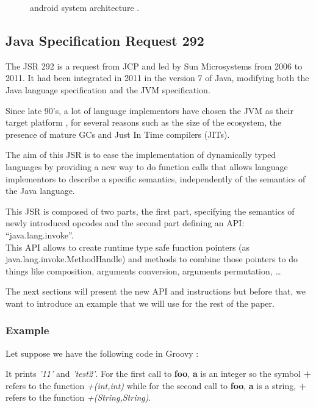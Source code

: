 \documentclass{sig-alternate}
\def \JCP{JCP\xspace}
\def \SUN{Sun Microsystems\xspace}
\def \Jsr{JSR\xspace}
\def \JSR{\Jsr 292\xspace}
\def \JVM{JVM\xspace}
\begin{document}
    \begin{figure}[!h]
      \centering \resizebox{\linewidth}{!}{}
      \caption{android system architecture \cite{wiki-android}.}
      \label{ASA}
    \end{figure}

  \subsection{Java Specification Request 292}

    The \JSR is a request from \JCP and led by \SUN from 2006 to 2011.
    It had been integrated in 2011 in the version 7 of Java,
    modifying both the Java language specification and the \JVM specification.

    Since late 90's, a lot of language
    implementors have chosen the JVM as their target platform \cite{wiki-jvm-lang},
    for several reasons such as the size of the ecosystem,
    the presence of mature GCs and Just In Time compilers (JITs).

    The aim of this \Jsr is to ease the implementation of dynamically typed languages
    by providing a new way to do function calls that allows language implementors
    to describe a specific semantics, independently of the semantics of the Java language.

    This \Jsr is composed of two parts, the first part, specifying the semantics of
    newly introduced opcodes and the second part defining an API: ``java.lang.invoke''.\\
    This API allows to create runtime type safe function pointers (as java.lang.invoke.MethodHandle)
    and methods to combine those pointers to do things like composition, arguments conversion,
    arguments permutation, \dots

    The next sections will present the new API and instructions but before that,
    we want to introduce an example that we will use for the rest of the paper.

    \subsubsection{Example}
      Let suppose we have the following code in Groovy \cite{lang-groovy}:

      

      It prints {\it '11'} and {\it 'test2'}.
      For the first call to {\bf foo}, {\bf a} is an integer so the symbol {\bf +} refers
      to the function {\it +(int,int)} while for the second call to {\bf foo}, {\bf a} is a string, {\bf +} refers to the function {\it +(String,String)}.
\end{document}
